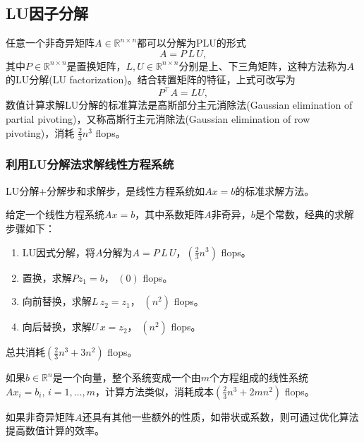 \begin{subappendices}
\subsection{LU因子分解}
\label{sec:numlin-factorization-lu}
任意一个非奇异矩阵$A \in \mathbb{R}^{n \times n}$都可以分解为PLU的形式
\begin{equation}
  A = P \, L \, U,
\end{equation}
其中$P \in \mathbb{R}^{n \times n}$是置换矩阵，$L, U \in \mathbb{R}^{n \times n}$分别是上、下三角矩阵，这种方法称为$A$的LU分解(LU factorization)。结合转置矩阵的特征，上式可改写为
\begin{equation}
  \label{eq:numlin-factorization-lu}
  P^{\top} A = LU,
\end{equation}
数值计算求解LU分解的标准算法是高斯部分主元消除法(Gaussian elimination of partial pivoting)，又称高斯行主元消除法(Gaussian elimination of row pivoting)，消耗 $\frac{2}{3} n^{3}$ flops。

\subsubsection{利用LU分解法求解线性方程系统}
LU分解+分解步和求解步，是线性方程系统如$Ax=b$的标准求解方法。
\begin{algorithm}[利用LU分解法求解线性方程系统]
  \label{algorithm:numlin-factorization-lu}
  给定一个线性方程系统$Ax=b$，其中系数矩阵$A$非奇异，$b$是个常数，经典的求解步骤如下：
  \begin{enumerate}
    \item LU因式分解，将$A$分解为$A = P \, L \, U$，$\left( \frac{2}{3} n^{3} \right)$ flops。
    \item 置换，求解$P z_{1} = b$， $(0)$ flops。
    \item 向前替换，求解$L \, z_{2} = z_{1}$， $\left( n^{2} \right)$ flops。
    \item 向后替换，求解$U \, x = z_{2}$， $ \left( n^{2} \right)$ flops。
  \end{enumerate}

  总共消耗$\left( \frac{2}{3} n^{3} + 3 n^{2} \right)$ flops。
\end{algorithm}

如果$b \in \mathbb{R}^{n}$是一个向量，整个系统变成一个由$m$个方程组成的线性系统$A x_{i} = b_{i}, \, i = 1,\ldots,m$，计算方法类似，消耗成本$\left( \frac{2}{3} n^{3} + 2 m n^{2} \right)$ flops。

如果非奇异矩阵$A$还具有其他一些额外的性质，如带状或系数，则可通过优化算法提高数值计算的效率。


\end{subappendices}
